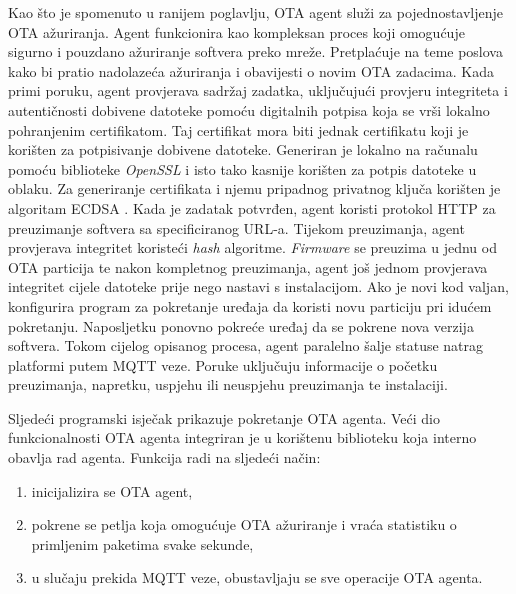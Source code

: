 Kao što je spomenuto u ranijem poglavlju, OTA agent služi za pojednostavljenje OTA ažuriranja. Agent funkcionira kao kompleksan proces koji omogućuje sigurno i pouzdano ažuriranje softvera preko mreže. Pretplaćuje na teme poslova kako bi pratio nadolazeća ažuriranja i obavijesti o novim OTA zadacima. Kada primi poruku, agent provjerava sadržaj zadatka, uključujući provjeru integriteta i autentičnosti dobivene datoteke pomoću digitalnih potpisa koja se vrši lokalno pohranjenim certifikatom. Taj certifikat mora biti jednak certifikatu koji je korišten za potpisivanje dobivene datoteke. Generiran je lokalno na računalu pomoću biblioteke \textit{OpenSSL} i isto tako kasnije korišten za potpis datoteke u oblaku. Za generiranje certifikata i njemu pripadnog privatnog ključa korišten je algoritam ECDSA . Kada je zadatak potvrđen, agent koristi protokol HTTP za preuzimanje softvera sa specificiranog URL-a. Tijekom preuzimanja, agent provjerava integritet koristeći \textit{hash} algoritme. \textit{Firmware} se preuzima u jednu od OTA particija te nakon kompletnog preuzimanja, agent još jednom provjerava integritet cijele datoteke prije nego nastavi s instalacijom. Ako je novi kod valjan, konfigurira program za pokretanje uređaja  da koristi novu particiju pri idućem pokretanju. Naposljetku ponovno pokreće uređaj da se pokrene nova verzija softvera. Tokom cijelog opisanog procesa, agent paralelno šalje statuse natrag platformi putem MQTT veze. Poruke uključuju informacije o početku preuzimanja, napretku, uspjehu ili neuspjehu preuzimanja te instalaciji. 

Sljedeći programski isječak prikazuje pokretanje OTA agenta. Veći dio funkcionalnosti OTA agenta integriran je u korištenu biblioteku koja interno obavlja rad agenta. Funkcija radi na sljedeći način:
\begin{enumerate}
	\item inicijalizira se OTA agent,
	\item pokrene se petlja koja omogućuje OTA ažuriranje i vraća statistiku o primljenim paketima svake sekunde,
	\item u slučaju prekida MQTT veze, obustavljaju se sve operacije OTA agenta. 
\end{enumerate}

